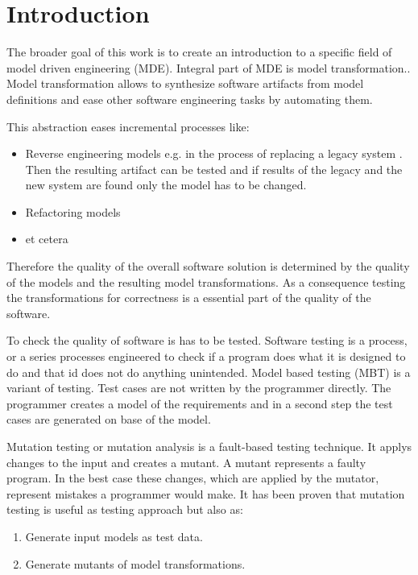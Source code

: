 \documentclass{llncs}
\begin{document}

\section{Introduction}

The broader goal of this work is to create an introduction to a specific field of model driven engineering (MDE). Integral part of MDE is model transformation.\cite{Sendall:2003}. Model transformation allows to synthesize software artifacts from model definitions and ease other software engineering tasks by automating them.

This abstraction eases incremental processes like:\cite{Sendall:2003}
\begin{itemize}
	\item Reverse engineering models e.g. in the process of replacing a legacy system . Then the resulting artifact can be tested and if results of the legacy and the new system are found only the model has to be changed.
	\item Refactoring models
	\item et cetera
\end{itemize}

Therefore the quality of the overall software solution is determined by the quality of the models and the resulting model transformations.\cite{Hutchinson:2011} As a consequence testing the transformations for correctness is a essential part of the quality of the software.\cite{troya:2015}

To check the quality of software is has to be tested. Software testing is a process, or a series processes engineered to check if a program does what it is designed to do and that id does not do anything unintended.\cite{Myers:2004} Model based testing (MBT) is a variant of testing. Test cases are not written by the programmer directly. The programmer creates a model of the requirements and in a second step the test cases are generated on base of the model.\cite{Utting:2012}

Mutation testing or mutation analysis is a fault-based testing technique. It applys changes to the input and creates a mutant. A mutant represents a faulty program. In the best case these changes, which are applied by the mutator, represent mistakes a programmer would make. It has been proven that mutation testing is useful as testing approach but also as:\cite{mutationssurvey:yue}

\begin{enumerate}
	\item Generate input models as test data.
	\item Generate mutants of model transformations.
\end{enumerate}
\end{document}
